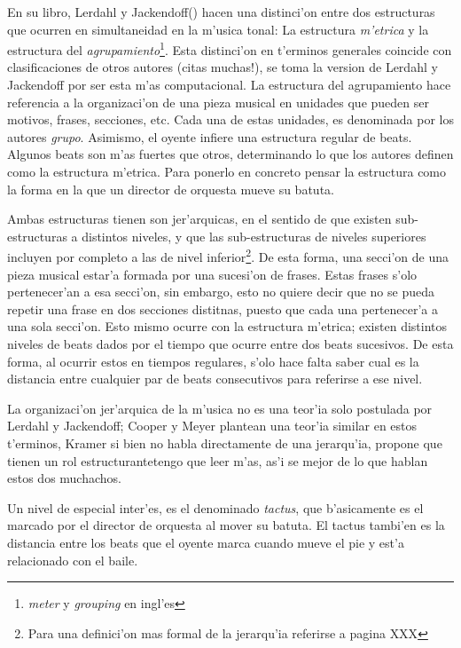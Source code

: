 En su libro, Lerdahl y Jackendoff(\cite{LerdahlJackendoff83}) hacen una distinci'on entre dos estructuras que ocurren en simultaneidad en la m'usica tonal:
La estructura \emph{m'etrica} y la estructura del \emph{agrupamiento}\footnote{\emph{meter} y \emph{grouping} en ingl'es}. 
Esta distinci'on en t'erminos generales coincide con clasificaciones de otros autores (\alert{citas muchas!}), se toma la version de Lerdahl y Jackendoff 
por ser esta m'as computacional.
La estructura del agrupamiento hace referencia a la organizaci'on de una pieza musical en unidades que pueden ser motivos, frases, secciones, etc. 
Cada una de estas unidades, es denominada por los autores \emph{grupo}. Asimismo, el oyente infiere una estructura regular de beats. 
Algunos beats son m'as fuertes que otros, determinando lo que los autores definen como la estructura m'etrica. 
Para ponerlo en concreto pensar la estructura como la forma en la que un director de orquesta mueve su batuta. 

Ambas estructuras tienen son jer'arquicas, en el sentido de que existen sub-estructuras a distintos niveles, y que las sub-estructuras de niveles superiores 
incluyen por completo a las de nivel inferior\footnote{Para una definici'on mas formal de la jerarqu'ia referirse a \cite{LerdahlJackendoff83} pagina \alert{XXX}}. De esta forma, una secci'on
de una pieza musical estar'a formada por una sucesi'on de frases. Estas frases s'olo pertenecer'an a esa secci'on, sin embargo, esto no quiere decir
que no se pueda repetir una frase en dos secciones distitnas, puesto que cada una pertenecer'a a una sola secci'on. 
Esto mismo ocurre con la estructura m'etrica; existen distintos niveles de beats dados por el tiempo que ocurre entre dos beats sucesivos. De esta forma, al 
ocurrir estos en tiempos regulares, s'olo hace falta saber cual es la distancia entre cualquier par de beats consecutivos para referirse a ese nivel. 


La organizaci'on jer'arquica de la m'usica no es una teor'ia solo postulada por Lerdahl y Jackendoff; Cooper y Meyer\cite{CooperMeyer60} plantean una teor'ia similar en
estos t'erminos, Kramer\cite{Kramer88} si bien no habla directamente de una jerarqu'ia, propone que tienen un rol 
estructurante\alert{tengo que leer m'as, as'i se mejor de lo que hablan estos dos muchachos}. 

Un nivel de especial inter'es, es el denominado \emph{tactus}, que b'asicamente es el marcado por el director de orquesta al mover su batuta. 
El tactus tambi'en es la distancia entre los beats que el oyente marca cuando mueve el pie y est'a relacionado con el baile. 

